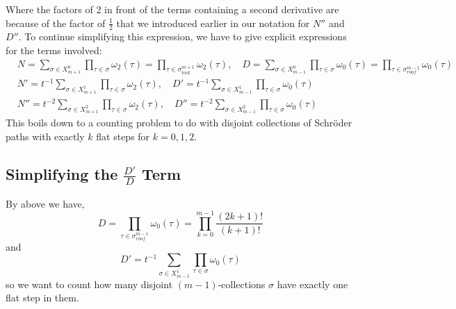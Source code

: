 \documentclass[11pt]{article}
\theoremstyle{definition}
\theoremstyle{definition}
\theoremstyle{plain}
\theoremstyle{plain}
\theoremstyle{plain}
\theoremstyle{definition}
\begin{document}
Where the factors of 2 in front of the terms containing a second derivative are because of the factor of $\frac{1}{2}$ that we introduced earlier in our notation for $N''$ and $D''$. To continue simplifying this expression, we have to give explicit expressions for the terms involved:
\begin{align*}
&N = \sum\limits_{\sigma\in X_{m+1}^0}\prod\limits_{\tau\in\sigma}\omega_2(\tau) = \prod\limits_{\tau\in\sigma_{\text{roof}}^{m+1}}\omega_2(\tau),\quad D = \sum\limits_{\sigma\in X_{m-1}^0}\prod\limits_{\tau\in\sigma}\omega_0(\tau) = \prod\limits_{\tau\in\sigma_{roof}^{m-1}}\omega_0(\tau) \\
&N' = t^{-1}\sum\limits_{\sigma\in X_{m+1}^1}\prod\limits_{\tau\in\sigma}\omega_2(\tau),\quad D' = t^{-1}\sum\limits_{\sigma\in X_{m-1}^1}\prod\limits_{\tau\in\sigma}\omega_0(\tau) \\
&N'' = t^{-2}\sum\limits_{\sigma\in X_{m+1}^2}\prod\limits_{\tau\in\sigma}\omega_2(\tau),\quad D'' = t^{-2}\sum\limits_{\sigma\in X_{m-1}^2}\prod\limits_{\tau\in\sigma}\omega_0(\tau)
\end{align*}
This boils down to a counting problem to do with disjoint collections of Schröder paths with exactly $k$ flat steps for $k = 0,1,2$.

\subsection*{Simplifying the $\frac{D'}{D}$ Term}

By above we have,
\begin{equation*}
D = \prod\limits_{\tau\in\sigma_{roof}^{m-1}}\omega_0(\tau) = \prod\limits_{k=0}^{m-1}\frac{(2k+1)!}{(k+1)!}
\end{equation*}
and
\begin{equation*}
D' = t^{-1}\sum\limits_{\sigma\in X_{m-1}^1}\prod\limits_{\tau\in\sigma}\omega_0(\tau)
\end{equation*}
so we want to count how many disjoint $(m-1)$-collections $\sigma$ have exactly one flat step in them.
\end{document}

